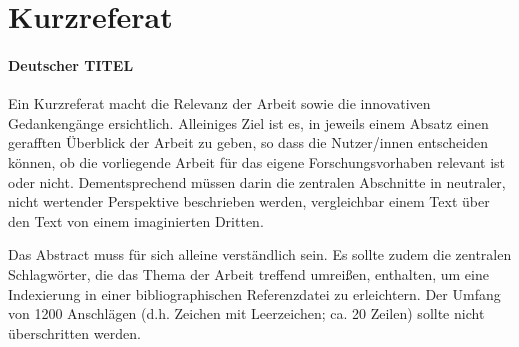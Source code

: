 \documentclass[./\jobname.tex]{subfiles}
\begin{document}
\setcounter{page}{2}
\chapter*{Kurzreferat}
\subsubsection*{Deutscher TITEL}
%
Ein Kurzreferat macht die Relevanz der Arbeit sowie die innovativen Gedankengänge ersichtlich. Alleiniges Ziel ist es, in jeweils einem Absatz einen gerafften Überblick der Arbeit zu geben, so dass die Nutzer/innen entscheiden können, ob die vorliegende Arbeit für das eigene Forschungsvorhaben relevant ist oder nicht. Dementsprechend müssen darin die zentralen Abschnitte in neutraler, nicht wertender Perspektive beschrieben werden, vergleichbar einem Text über den Text von einem imaginierten Dritten.\par
%
Das Abstract muss für sich alleine verständlich sein. Es sollte zudem die zentralen Schlagwörter, die das Thema der Arbeit treffend umreißen, enthalten, um eine Indexierung in einer bibliographischen Referenzdatei zu erleichtern. Der Umfang von 1200 Anschlägen (d.h. Zeichen mit Leerzeichen; ca. 20 Zeilen) sollte nicht überschritten werden.\par
%
\blindtext[2]
\end{document}
